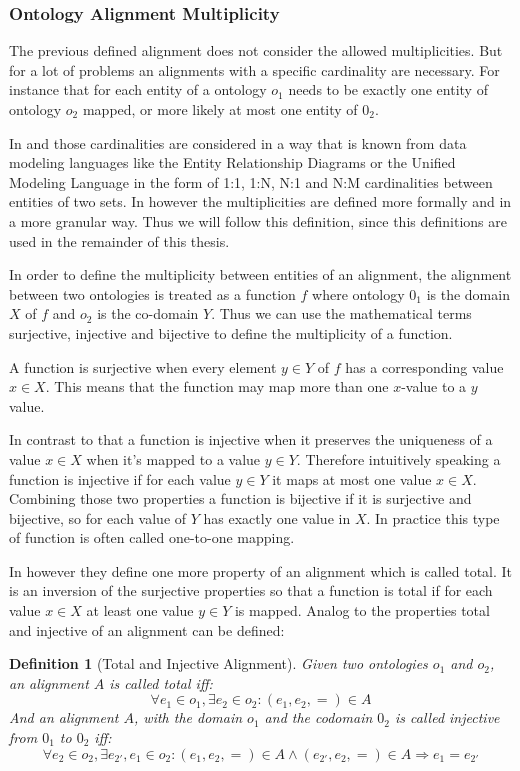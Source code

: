 \documentclass[11pt,titlepage,oneside,openany,a4paper]{report}
\newtheorem{definition}{Definition}[chapter]
\begin{document}
\subsubsection{Ontology Alignment Multiplicity}
\label{sec:oa_multiplicity}
The previous defined alignment does not consider the allowed multiplicities. But for a lot of problems an alignments with a specific cardinality are necessary. For instance that for each entity of a ontology $o_1$ needs to be exactly one entity of ontology $o_2$ mapped, or more likely at most one entity of $0_2$.

In \cite{Rahm:2001} and \cite{ehrig2006ontology} those cardinalities are considered in a way that is known from data modeling languages like the Entity Relationship Diagrams or the Unified Modeling Language in the form of 1:1, 1:N, N:1 and N:M cardinalities between entities of two sets. In \cite{euzenat2013d} however the multiplicities are defined more formally and in a more granular way. Thus we will follow this definition, since this definitions are used in the remainder of this thesis.

In order to define the multiplicity between entities of an alignment, the alignment between two ontologies is treated as a function $f$ where ontology $0_1$ is the domain $X$ of $f$ and $o_2$ is the co-domain $Y$. Thus we can use the mathematical terms surjective, injective and bijective to define the multiplicity of a function.

A function is surjective when every element $y \in Y$ of $f$ has a corresponding value $x \in X$. This means that the function may map more than one $x$-value to a $y$ value.

In contrast to that a function is injective when it preserves the uniqueness of a value $x \in X$ when it's mapped to a value $y \in Y$. Therefore intuitively speaking a function is injective if for each value $y \in Y$ it maps at most one value $x \in X$.
Combining those two properties a function is bijective if it is surjective and bijective, so for each value of $Y$ has exactly one value in $X$. In practice this type of function is often called one-to-one mapping.

In \cite{euzenat2013d} however they define one more property of an alignment which is called total. It is an inversion of the surjective properties so that a function is total if for each value $x \in X$ at least one value $y \in Y$ is mapped.
Analog to \cite{euzenat2013d} the properties total and injective of an alignment can be defined:
\begin{definition} [Total and Injective Alignment]
Given two ontologies $o_1$ and $o_2$, an alignment $A$ is called total iff:
\begin{equation*}
\forall e_1 \in o_1, \exists e_2 \in o_2 : (e_1,e_2,=) \in A
\end{equation*}
And an alignment $A$, with the domain $o_1$ and the codomain $0_2$ is called injective from $0_1$ to $0_2$ iff:
\begin{equation*}
\forall e_2 \in o_2 , \exists e_{2'},e_1 \in o_2 : (e_1,e_2,=) \in A \wedge (e_{2'},e_2,=) \in A \Rightarrow e_1 = e_{2'}
\end{equation*}
\end{definition}
\end{document}
